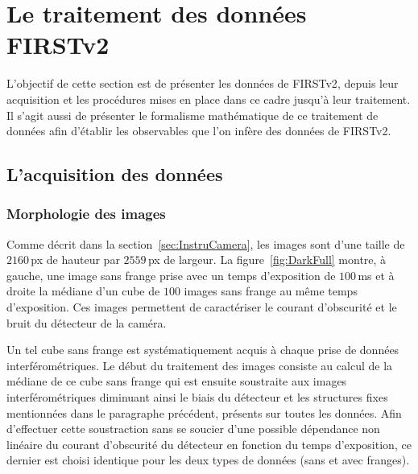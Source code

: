 \clearpage
\section{Le traitement des données FIRSTv2}
\label{sec:DataReduction}
\setcounter{figure}{0}
\setcounter{table}{0}

L'objectif de cette section est de présenter les données de \ac{FIRSTv2}, depuis leur acquisition et les procédures mises en place dans ce cadre jusqu'à leur traitement. Il s'agit aussi de présenter le formalisme mathématique de ce traitement de données afin d'établir les observables que l'on infère des données de \ac{FIRSTv2}.


\subsection{L'acquisition des données}

\subsubsection{Morphologie des images}

\label{sec:CameraDark}

Comme décrit dans la section~\ref{sec:InstruCamera}, les images sont d'une taille de $2160 \,$px de hauteur par $2559 \,$px de largeur. La figure~\ref{fig:DarkFull} montre, à gauche, une image sans frange prise avec un temps d'exposition de $100 \,$ms et à droite la médiane d'un cube de $100$ images sans frange au même temps d'exposition. Ces images permettent de caractériser le courant d'obscurité et le bruit du détecteur de la caméra. 

Un tel cube sans frange est systématiquement acquis à chaque prise de données interférométriques. Le début du traitement des images consiste au calcul de la médiane de ce cube sans frange qui est ensuite soustraite aux images interférométriques diminuant ainsi le biais du détecteur et les structures fixes mentionnées dans le paragraphe précédent, présents sur toutes les données. Afin d'effectuer cette soustraction sans se soucier d'une possible dépendance non linéaire du courant d'obscurité du détecteur en fonction du temps d'exposition, ce dernier est choisi identique pour les deux types de données (sans et avec franges).

